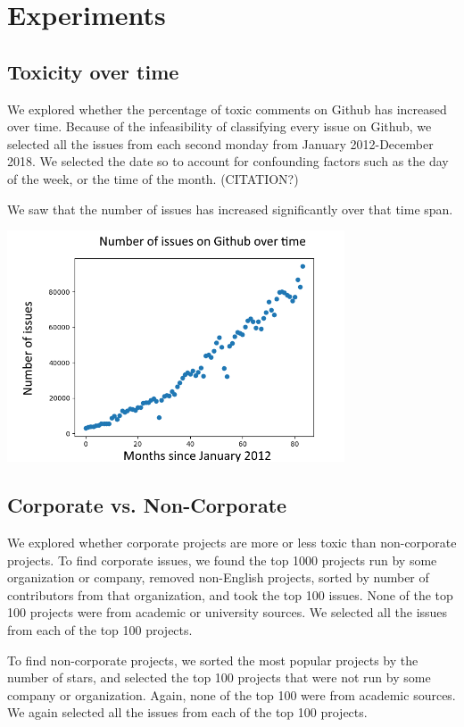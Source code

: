 \documentclass[conference]{IEEEtran}
\begin{document}
\section{Experiments} 
\subsection{Toxicity over time} 
We explored whether the percentage of toxic comments on Github has increased over time. Because of the infeasibility of classifying every issue on Github, we selected all the issues from each second monday from January 2012-December 2018. We selected the date so to account for confounding factors such as the day of the week, or the time of the month. (CITATION?)

We saw that the number of issues has increased significantly over that time span.
 
\includegraphics[width=10cm]{issues_per_month.png}

\subsection{Corporate vs. Non-Corporate} 
We explored whether corporate projects are more or less toxic than non-corporate projects. To find corporate issues, we found the top 1000 projects run by some organization or company, removed non-English projects, sorted by number of contributors from that organization, and took the top 100 issues. None of the top 100 projects were from academic or university sources. We selected all the issues from each of the top 100 projects. 

To find non-corporate projects, we sorted the most popular projects by the number of stars, and selected the top 100 projects that were not run by some company or organization. Again, none of the top 100 were from academic sources. We again selected all the issues from each of the top 100 projects. 
\end{document}
